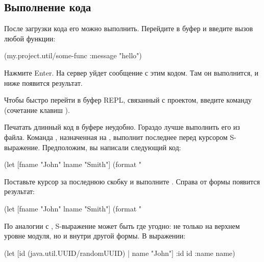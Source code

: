\subsection{Выполнение кода}

После загрузки кода его можно выполнить. Перейдите в буфер  и введите вызов любой функции:

\begin{english}
  \begin{clojure}
(my.project.util/some-func {:message "hello"})
  \end{clojure}
\end{english}

Нажмите Enter. На сервер уйдет сообщение с этим кодом. Там он выполнится, и ниже появится результат.

Чтобы быстро перейти в буфер REPL, связанный с проектом, введите команду  (сочетание клавиш ).

Печатать длинный код в буфере  неудобно. Гораздо лучше выполнить его из файла. Команда , назначенная на , выполнит последнее перед курсором S-выражение. Предположим, вы написали следующий код:

\begin{english}
  \begin{clojure}
(let [fname "John"
      lname "Smith"]
  (format "%
  \end{clojure}
\end{english}

Поставьте курсор за последнюю скобку и выполните . Справа от формы появится результат:

\begin{english}
  \begin{clojure}
(let [fname "John"
      lname "Smith"]
  (format "%
  \end{clojure}
\end{english}

По аналогии с , S-выражение может быть где угодно: не только на верхнем уровне модуля, но и внутри другой формы. В выражении:

\begin{english}
  \begin{clojure}
(let [id (java.util.UUID/randomUUID) |
      name "John"]
  {:id id
   :name name})
  \end{clojure}
\end{english}

